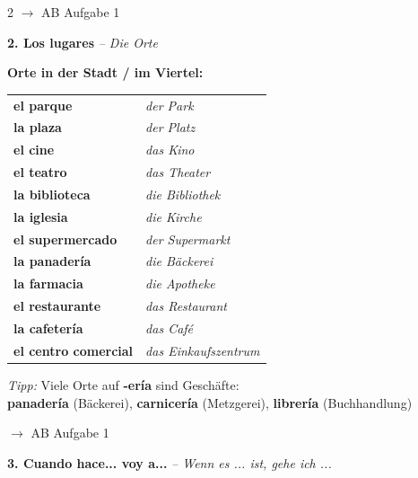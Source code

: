 \documentclass[11pt, a4paper]{article}
\newcommand{\seriftext}[1]{{\fontfamily{ppl}\selectfont #1}}
\newcommand{\es}[1]{\seriftext{\textbf{#1}}}
\newcommand{\de}[1]{\textit{\textcolor{akzent}{#1}}}
\newcommand{\abmark}[1]{{\footnotesize\textcolor{akzent}{$\rightarrow$ AB #1}}}
\newcommand{\abschnitt}[2]{\noindent\textbf{\large #1. #2}}
\begin{document}
\begin{multicols}{2}
\abmark{Aufgabe 1}

\columnbreak

\abschnitt{2}{Los lugares} \de{-- Die Orte}

\vspace{4pt}

\textbf{Orte in der Stadt / im Viertel:}

\begin{tabular}{@{}ll@{}}
\es{el parque} & \de{der Park} \\[0.4em]
\es{la plaza} & \de{der Platz} \\[0.4em]
\es{el cine} & \de{das Kino} \\[0.4em]
\es{el teatro} & \de{das Theater} \\[0.4em]
\es{la biblioteca} & \de{die Bibliothek} \\[0.4em]
\es{la iglesia} & \de{die Kirche} \\[0.4em]
\es{el supermercado} & \de{der Supermarkt} \\[0.4em]
\es{la panadería} & \de{die Bäckerei} \\[0.4em]
\es{la farmacia} & \de{die Apotheke} \\[0.4em]
\es{el restaurante} & \de{das Restaurant} \\[0.4em]
\es{la cafetería} & \de{das Café} \\[0.4em]
\es{el centro comercial} & \de{das Einkaufszentrum} \\
\end{tabular}

\vspace{6pt}

\begin{tippbox}
\footnotesize\textit{Tipp:} Viele Orte auf \es{-ería} sind Geschäfte:\\
\es{panadería} (Bäckerei), \es{carnicería} (Metzgerei), \es{librería} (Buchhandlung)
\end{tippbox}

\abmark{Aufgabe 1}

\end{multicols}

\newpage

\abschnitt{3}{Cuando hace... voy a...} \de{-- Wenn es ... ist, gehe ich ...}
\end{document}
